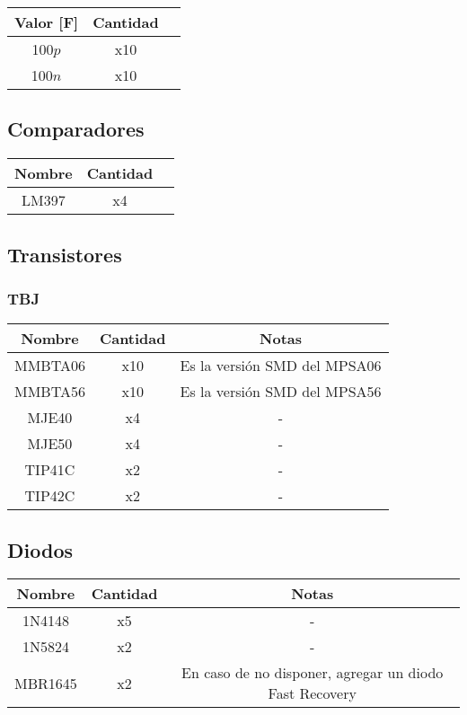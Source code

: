 \documentclass[a4paper,11pt]{article}
\begin{document}
\begin{table}[h]
\centering
\begin{tabular}{|c|c|c|}
\hline
Valor [F] & Cantidad \\
\hline
100$p$   &  x10   	\\
100$n$  &  	x10    	\\
 \hline
\end{tabular}
\end{table}

\subsection{Comparadores}

\begin{table}[H]
\centering
\begin{tabular}{|c|c|c|}
\hline
Nombre & Cantidad \\
\hline
LM397  &  x4   	\\
 \hline
\end{tabular}
\end{table}

\subsection{Transistores}

\subsubsection{TBJ}
\begin{table}[H]
\centering
\begin{tabular}{|c|c|c|}
\hline
Nombre & Cantidad & Notas\\
\hline
MMBTA06  &  x10  & Es la versión SMD del MPSA06 \\
MMBTA56  &  x10  & Es la versión SMD del MPSA56 \\
MJE40    &  x4   &        -\\
MJE50 & x4 & -\\
TIP41C & x2 & -\\
TIP42C & x2 & - \\
 \hline
\end{tabular}
\end{table}

\subsection{Diodos}


\begin{table}[H]
\centering
\begin{tabular}{|c|c|c|}
\hline
Nombre & Cantidad  &  Notas\\
\hline
1N4148  &  x5  & - 	\\
1N5824 & x2 & -\\
MBR1645 & x2 & En caso de no disponer, agregar un diodo Fast Recovery\\
 \hline
\end{tabular}
\end{table}
\end{document}
